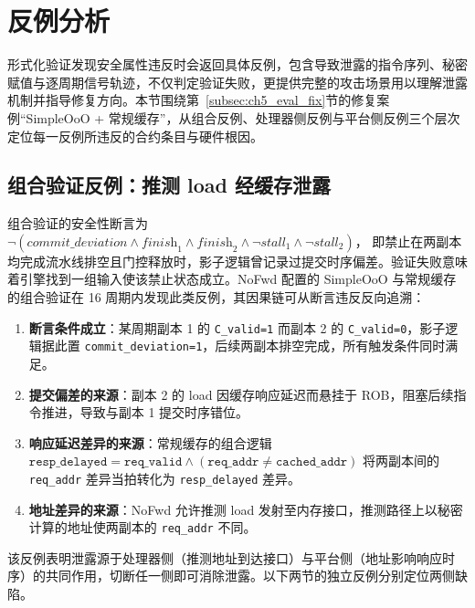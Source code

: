 \section{反例分析}
\label{sec:ch5_cex_analysis}
形式化验证发现安全属性违反时会返回具体反例，包含导致泄露的指令序列、秘密赋值与逐周期信号轨迹，不仅判定验证失败，更提供完整的攻击场景用以理解泄露机制并指导修复方向。本节围绕第~\ref{subsec:ch5_eval_fix}节的修复案例``SimpleOoO + 常规缓存''，从组合反例、处理器侧反例与平台侧反例三个层次定位每一反例所违反的合约条目与硬件根因。

\subsection{组合验证反例：推测 load 经缓存泄露}
\label{subsec:ch5_cex_combined}

组合验证的安全性断言为
$\neg(\textit{commit\_deviation} \wedge \textit{finish}_1 \wedge \textit{finish}_2 \wedge \neg \textit{stall}_1 \wedge \neg \textit{stall}_2)$，
即禁止在两副本均完成流水线排空且门控释放时，影子逻辑曾记录过提交时序偏差。验证失败意味着引擎找到一组输入使该禁止状态成立。NoFwd 配置的 SimpleOoO 与常规缓存的组合验证在 16 周期内发现此类反例，其因果链可从断言违反反向追溯：

\begin{enumerate}
    \item \textbf{断言条件成立}：某周期副本 1 的 \texttt{C\_valid=1} 而副本 2 的 \texttt{C\_valid=0}，影子逻辑据此置 \texttt{commit\_deviation=1}，后续两副本排空完成，所有触发条件同时满足。
    \item \textbf{提交偏差的来源}：副本 2 的 load 因缓存响应延迟而悬挂于 ROB，阻塞后续指令推进，导致与副本 1 提交时序错位。
    \item \textbf{响应延迟差异的来源}：常规缓存的组合逻辑
          $\texttt{resp\_delayed} = \texttt{req\_valid} \land (\texttt{req\_addr} \neq \texttt{cached\_addr})$
          将两副本间的 \texttt{req\_addr} 差异当拍转化为 \texttt{resp\_delayed} 差异。
    \item \textbf{地址差异的来源}：NoFwd 允许推测 load 发射至内存接口，推测路径上以秘密计算的地址使两副本的 \texttt{req\_addr} 不同。
\end{enumerate}

该反例表明泄露源于处理器侧（推测地址到达接口）与平台侧（地址影响响应时序）的共同作用，切断任一侧即可消除泄露。以下两节的独立反例分别定位两侧缺陷。


